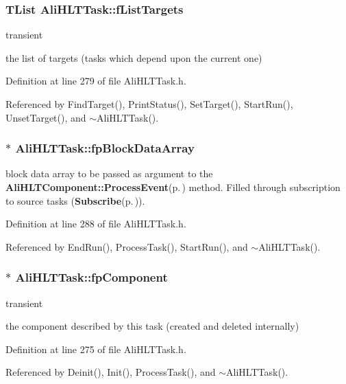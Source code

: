 \subsubsection{\setlength{\rightskip}{0pt plus 5cm}TList {\bf Ali\-HLTTask::f\-List\-Targets}\hspace{0.3cm}{\tt  [private]}}\label{classAliHLTTask_r3}


transient 

the list of targets (tasks which depend upon the current one) 

Definition at line 279 of file Ali\-HLTTask.h.

Referenced by Find\-Target(), Print\-Status(), Set\-Target(), Start\-Run(), Unset\-Target(), and $\sim$Ali\-HLTTask().
\subsubsection{$\ast$ {\bf Ali\-HLTTask::fp\-Block\-Data\-Array}\hspace{0.3cm}{\tt  [private]}}\label{classAliHLTTask_r5}


block data array to be passed as argument to the {\bf Ali\-HLTComponent::Process\-Event}{\rm (p.\,\pageref{classAliHLTComponent_a6})} method. Filled through subscription to source tasks ({\bf Subscribe}{\rm (p.\,\pageref{classAliHLTTask_a23})}). 

Definition at line 288 of file Ali\-HLTTask.h.

Referenced by End\-Run(), Process\-Task(), Start\-Run(), and $\sim$Ali\-HLTTask().
\subsubsection{$\ast$ {\bf Ali\-HLTTask::fp\-Component}\hspace{0.3cm}{\tt  [private]}}\label{classAliHLTTask_r1}


transient 

the component described by this task (created and deleted internally) 

Definition at line 275 of file Ali\-HLTTask.h.

Referenced by Deinit(), Init(), Process\-Task(), and $\sim$Ali\-HLTTask().
